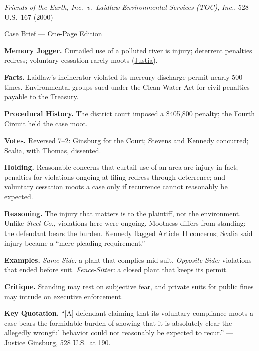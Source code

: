 \documentclass[12pt]{article}
\begin{document}
\begin{center}
{\Large \textit{Friends of the Earth, Inc.\ v.\ Laidlaw Environmental Services (TOC), Inc.}, 528 U.S.\ 167 (2000)\par}
\vspace{0.3em}
{\normalsize Case Brief --- One-Page Edition\par}
\end{center}

\textbf{Memory Jogger.} Curtailed use of a polluted river is injury; deterrent penalties redress; voluntary cessation rarely moots (\href{https://supreme.justia.com/cases/federal/us/528/167/}{Justia}).

\textbf{Facts.} Laidlaw's incinerator violated its mercury discharge permit nearly 500 times. Environmental groups sued under the Clean Water Act for civil penalties payable to the Treasury.

\textbf{Procedural History.} The district court imposed a \$405,800 penalty; the Fourth Circuit held the case moot.

\textbf{Votes.} Reversed 7--2: Ginsburg for the Court; Stevens and Kennedy concurred; Scalia, with Thomas, dissented.

\textbf{Holding.} Reasonable concerns that curtail use of an area are injury in fact; penalties for violations ongoing at filing redress through deterrence; and voluntary cessation moots a case only if recurrence cannot reasonably be expected.

\textbf{Reasoning.} The injury that matters is to the plaintiff, not the environment. Unlike \textit{Steel Co.}, violations here were ongoing. Mootness differs from standing: the defendant bears the burden. Kennedy flagged Article~II concerns; Scalia said injury became a ``mere pleading requirement.''

\textbf{Examples.} \emph{Same-Side:} a plant that complies mid-suit. \emph{Opposite-Side:} violations that ended before suit. \emph{Fence-Sitter:} a closed plant that keeps its permit.

\textbf{Critique.} Standing may rest on subjective fear, and private suits for public fines may intrude on executive enforcement.

\textbf{Key Quotation.} ``[A] defendant claiming that its voluntary compliance moots a case bears the formidable burden of showing that it is absolutely clear the allegedly wrongful behavior could not reasonably be expected to recur.'' --- Justice Ginsburg, 528 U.S.\ at 190.
\end{document}
